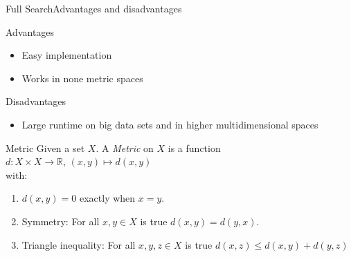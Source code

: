 \documentclass[handout]{beamer}
\begin{document}
\begin{frame}{Full Search}{Advantages and disadvantages}
 \begin{block}{Advantages}
  \begin{itemize}
   \item Easy implementation
   \pause
   \item Works in none metric spaces
  \end{itemize}
 \end{block}
 \pause
 \begin{block}{Disadvantages}
  \begin{itemize}
   \item Large runtime on big data sets and in higher multidimensional spaces
  \end{itemize}
 \end{block}
\end{frame}

\begin{frame}{Metric}
  Given a set $X$. A \textit{Metric} on $X$ is a function\\
  $d:X \times X \to \mathbb{R}$, $(x, y) \mapsto d(x, y)$\\
  with:
 \begin{enumerate}
 \pause
  \item $d(x, y) = 0$ exactly when $x=y$.
  \pause
  \item Symmetry: For all $x, y \in X$ is true $d(x, y) = d(y, x)$.
  \pause
  \item Triangle inequality: For all $x, y, z \in X$ is true $d(x, z) \le d(x, y) + d(y,z)$
 \end{enumerate}
 \flushright{\tiny{[Forster, 2006]}}
\end{frame}
\end{document}
